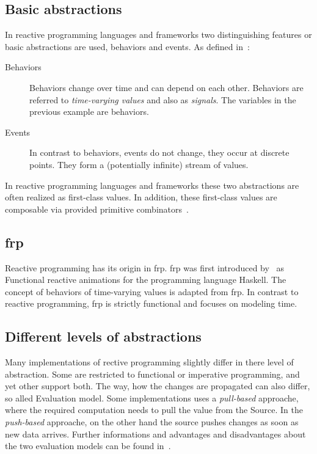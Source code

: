 \documentclass[acmsmall]{acmart}\settopmatter{printfolios=true,printccs=false,printacmref=false}
\begin{document}
	\subsection{Basic abstractions}
	In reactive programming languages and frameworks two distinguishing features or basic abstractions are used, behaviors and events.
	As defined in~\cite{Bainomugisha:2013}:

	\begin{description}
		\item[Behaviors]
		Behaviors change over time and can depend on each other. 
		Behaviors are referred to \textit{time-varying values} and also as \textit{signals}.
		The variables in the previous example are behaviors. 
		\item[Events]
		In contrast to behaviors, events do not change, they occur at discrete points. 
		They form a (potentially infinite) stream of values.
	\end{description}

	In reactive programming languages and frameworks these two abstractions are often realized as first-class values.
	In addition, these first-class values are composable via provided primitive combinators~\cite{Bainomugisha:2013}.

	\subsection{\ac{frp}}
		Reactive programming has its origin in \ac{frp}. 
		\ac{frp} was first introduced by~\cite{Elliott} as Functional reactive animations for the programming language Haskell.
		The concept of behaviors of time-varying values is adapted from \ac{frp}. 
		In contrast to reactive programming, \ac{frp} is strictly functional and focuses on modeling time.

	\subsection{Different levels of abstractions}
		Many implementations of rective programming slightly differ in there level of abstraction.
		Some are restricted to functional or imperative programming, and yet other support both.
		The way, how the changes are propagated can also differ, so alled Evaluation model.
		Some implementations uses a \textit{pull-based} approache, where the required computation needs to pull the value from the Source.
		In the \textit{push-based} approache, on the other hand the source pushes changes as soon as new data arrives.
		Further informations and advantages and disadvantages about the two evaluation models can be found in~\cite{Bainomugisha:2013}.
\end{document}
